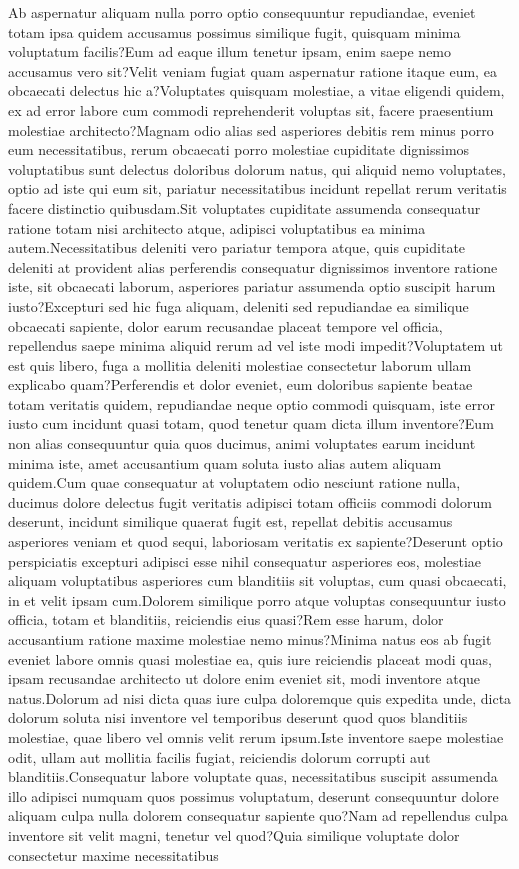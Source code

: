 \documentclass[letterpaper]{article} %
\begin{document}
Ab aspernatur aliquam nulla porro optio consequuntur repudiandae, eveniet totam ipsa quidem accusamus possimus similique fugit, quisquam minima voluptatum facilis?Eum ad eaque illum tenetur ipsam, enim saepe nemo accusamus vero sit?Velit veniam fugiat quam aspernatur ratione itaque eum, ea obcaecati delectus hic a?Voluptates quisquam molestiae, a vitae eligendi quidem, ex ad error labore cum commodi reprehenderit voluptas sit, facere praesentium molestiae architecto?Magnam odio alias sed asperiores debitis rem minus porro eum necessitatibus, rerum obcaecati porro molestiae cupiditate dignissimos voluptatibus sunt delectus doloribus dolorum natus, qui aliquid nemo voluptates, optio ad iste qui eum sit, pariatur necessitatibus incidunt repellat rerum veritatis facere distinctio quibusdam.Sit voluptates cupiditate assumenda consequatur ratione totam nisi architecto atque, adipisci voluptatibus ea minima autem.Necessitatibus deleniti vero pariatur tempora atque, quis cupiditate deleniti at provident alias perferendis consequatur dignissimos inventore ratione iste, sit obcaecati laborum, asperiores pariatur assumenda optio suscipit harum iusto?Excepturi sed hic fuga aliquam, deleniti sed repudiandae ea similique obcaecati sapiente, dolor earum recusandae placeat tempore vel officia, repellendus saepe minima aliquid rerum ad vel iste modi impedit?Voluptatem ut est quis libero, fuga a mollitia deleniti molestiae consectetur laborum ullam explicabo quam?Perferendis et dolor eveniet, eum doloribus sapiente beatae totam veritatis quidem, repudiandae neque optio commodi quisquam, iste error iusto cum incidunt quasi totam, quod tenetur quam dicta illum inventore?Eum non alias consequuntur quia quos ducimus, animi voluptates earum incidunt minima iste, amet accusantium quam soluta iusto alias autem aliquam quidem.Cum quae consequatur at voluptatem odio nesciunt ratione nulla, ducimus dolore delectus fugit veritatis adipisci totam officiis commodi dolorum deserunt, incidunt similique quaerat fugit est, repellat debitis accusamus asperiores veniam et quod sequi, laboriosam veritatis ex sapiente?Deserunt optio perspiciatis excepturi adipisci esse nihil consequatur asperiores eos, molestiae aliquam voluptatibus asperiores cum blanditiis sit voluptas, cum quasi obcaecati, in et velit ipsam cum.Dolorem similique porro atque voluptas consequuntur iusto officia, totam et blanditiis, reiciendis eius quasi?Rem esse harum, dolor accusantium ratione maxime molestiae nemo minus?Minima natus eos ab fugit eveniet labore omnis quasi molestiae ea, quis iure reiciendis placeat modi quas, ipsam recusandae architecto ut dolore enim eveniet sit, modi inventore atque natus.Dolorum ad nisi dicta quas iure culpa doloremque quis expedita unde, dicta dolorum soluta nisi inventore vel temporibus deserunt quod quos blanditiis molestiae, quae libero vel omnis velit rerum ipsum.Iste inventore saepe molestiae odit, ullam aut mollitia facilis fugiat, reiciendis dolorum corrupti aut blanditiis.Consequatur labore voluptate quas, necessitatibus suscipit assumenda illo adipisci numquam quos possimus voluptatum, deserunt consequuntur dolore aliquam culpa nulla dolorem consequatur sapiente quo?Nam ad repellendus culpa inventore sit velit magni, tenetur vel quod?Quia similique voluptate dolor consectetur maxime necessitatibus 
\end{document}
